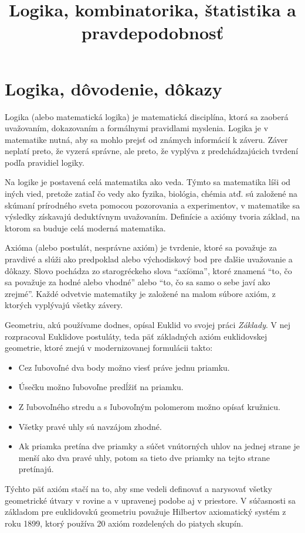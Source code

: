 \documentclass{article}
\title{Logika, kombinatorika, štatistika a pravdepodobnosť}
\begin{document}
\maketitle

\section{Logika, dôvodenie, dôkazy}

Logika (alebo matematická logika) je matematická disciplína, ktorá sa zaoberá uvažovaním, dokazovaním a formálnymi pravidlami myslenia. Logika je v matematike nutná, aby sa mohlo prejsť od známych informácií k záveru. Záver neplatí preto, že vyzerá správne, ale preto, že vyplýva z predchádzajúcich tvrdení podľa pravidiel logiky.

Na logike je postavená celá matematika ako veda. Týmto sa matematika líši od iných vied, pretože zatiaľ čo vedy ako fyzika, biológia, chémia atď. sú založené na skúmaní prírodného sveta pomocou pozorovania a experimentov, v matematike sa výsledky získavajú deduktívnym uvažovaním. Definície a axiómy tvoria základ, na ktorom sa buduje celá moderná matematika.

Axióma (alebo postulát, nesprávne axióm) je tvrdenie, ktoré sa považuje za pravdivé a slúži ako predpoklad alebo východiskový bod pre ďalšie uvažovanie a dôkazy. Slovo pochádza zo starogréckeho slova \enquote{axíōma}, ktoré znamená \enquote{to, čo sa považuje za hodné alebo vhodné} alebo \enquote{to, čo sa samo o sebe javí ako zrejmé}. Každé odvetvie matematiky je založené na malom súbore axióm, z ktorých vyplývajú všetky závery.

Geometriu, akú používame dodnes, opísal Euklid vo svojej práci \emph{Základy}. V nej rozpracoval Euklidove postuláty, teda päť základných axióm euklidovskej geometrie, ktoré znejú v modernizovanej formulácii takto:
\begin{itemize}
  \item Cez ľubovoľné dva body možno viesť práve jednu priamku.
  \item Úsečku možno ľubovoľne predĺžiť na priamku.
  \item Z ľubovoľného stredu a s ľubovoľným polomerom možno opísať kružnicu.
  \item Všetky pravé uhly sú navzájom zhodné.
  \item Ak priamka pretína dve priamky a súčet vnútorných uhlov na jednej strane je menší ako dva pravé uhly, potom sa tieto dve priamky na tejto strane pretínajú.
\end{itemize}
Týchto päť axióm stačí na to, aby sme vedeli definovať a narysovať všetky geometrické útvary v rovine a v upravenej podobe aj v priestore. V súčasnosti sa základom pre euklidovskú geometriu považuje Hilbertov axiomatický systém z roku 1899, ktorý používa 20 axióm rozdelených do piatych skupín.
\end{document}
